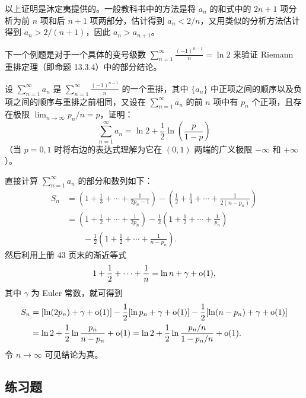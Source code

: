 \begin{xremark}
以上证明是沐定夷提供的。一般教科书中的方法是将 $a_n$ 的和式中的 $2n+1$ 项分析为前 $n$ 项和后 $n+1$ 项两部分，估计得到 $a_n<2/n$，又用类似的分析方法估计得到 $a_n>2/(n+1)$，因此 $a_n>a_{n+1}$。
\end{xremark}

下一个例题是对于一个具体的变号级数 $\sum_{n=1}^{\infty}\frac{(-1)^{n-1}}n=\ln2$ 来验证 Riemann 重排定理（即命题 13.3.4）中的部分结论。

\begin{xexample}[13.3.5]
设 $\sum_{n=1}^{\infty}a_n$ 是 $\sum_{n=1}^{\infty}\frac{(-1)^{n-1}}n$ 的一个重排，其中 $\{a_n\}$ 中正项之间的顺序以及负项之间的顺序与重排之前相同，又设在 $\sum_{n=1}^{\infty}a_n$ 的前 $n$ 项中有 $p_n$ 个正项，且存在极限 $\lim_{n\to\infty}p_n/n=p$，证明：
\[
\sum_{n=1}^{\infty}a_n=\ln2+\frac12\ln\left(\frac p{1-p}\right)
\]
（当 $p=0,1$ 时将右边的表达式理解为它在 $(0,1)$ 两端的广义极限 $-\infty$ 和 $+\infty$）。
\end{xexample}
\begin{xproof}
直接计算 $\sum_{n=1}^{\infty}a_n$ 的部分和数列如下：
\[
\begin{aligned}
S_n&=\left(1+\frac13+\cdots+\frac1{2p_n-1}\right)-\left(\frac12+\frac14+\cdots+\frac1{2(n-p_n)}\right)\\
&=\left(1+\frac12+\cdots+\frac1{2p_n}\right)-\frac12\left(1+\frac12+\cdots+\frac1{p_n}\right)\\
&\qquad-\frac12\left(1+\frac12+\cdots+\frac1{n-p_n}\right).
\end{aligned}
\]
然后利用上册 43 页末的渐近等式
\[
1+\frac12+\cdots+\frac1n=\ln n+\gamma+\mathrm{o}(1),
\]
其中 $\gamma$ 为 Euler 常数，就可得到
\[
\begin{aligned}
S_n&=[\ln(2p_n)+\gamma+\mathrm{o}(1)]-\frac12[\ln p_n+\gamma+\mathrm{o}(1)]-\frac12[\ln(n-p_n)+\gamma+\mathrm{o}(1)]\\
&=\ln2+\frac12\ln\frac{p_n}{n-p_n}+\mathrm{o}(1)
=\ln2+\frac12\ln\frac{p_n/n}{1-p_n/n}+\mathrm{o}(1).
\end{aligned}
\]
令 $n\to\infty$ 可见结论为真。
\end{xproof}

\subsection{练习题}

